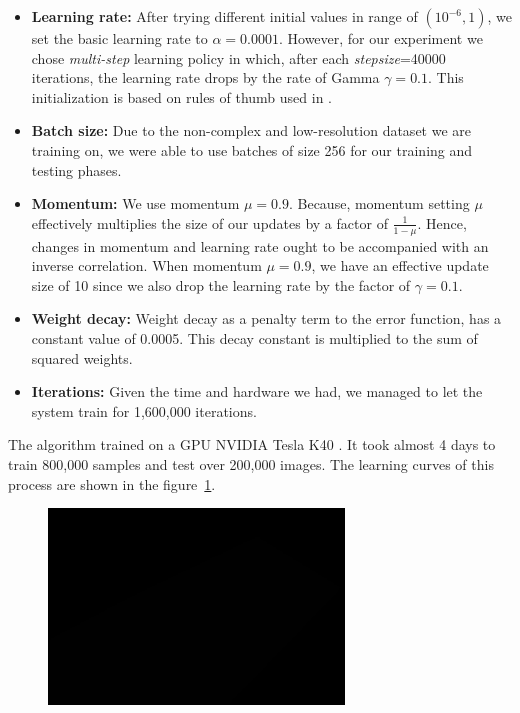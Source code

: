 \begin{itemize}
\label{solv:param}
\item \textbf{Learning rate:} After trying different initial values in range of $(10^{-6}, 1)$, we set the basic learning rate to $\alpha = 0.0001$. However, for our experiment we chose \textit{multi-step} learning policy in which, after each \textit{stepsize}=40000 iterations, the learning rate drops by the rate of Gamma $\gamma = 0.1$. This initialization is based on rules of thumb used in \cite{krizhevsky2012imagenet}.
\item \textbf{Batch size:} Due to the non-complex and low-resolution dataset we are training on, we were able to use batches of size 256 for our training and testing phases.
\item \textbf{Momentum:} We use momentum $\mu = 0.9$. Because, momentum setting $\mu$ effectively multiplies the size of our updates by a factor of $\frac{1}{1-\mu}$. Hence, changes in momentum and learning rate ought to be accompanied with an inverse correlation. When momentum $\mu = 0.9$, we have an effective update size of 10 since we also drop the learning rate by the factor of $\gamma= 0.1$.
\item \textbf{Weight decay:} Weight decay as a penalty term to the error function, has a constant value of 0.0005. This decay constant is multiplied to the sum of squared weights.
\item \textbf{Iterations:} Given the time and hardware we had, we managed to let the system train for 1,600,000 iterations.
\end{itemize}

\noindent The algorithm trained on a GPU NVIDIA \cite{kirk2007nvidia} Tesla K40 \cite{lindholm2008nvidia}. It took almost 4 days to train 800,000 samples and test over 200,000 images. The learning curves of this process are shown in the figure~\ref{fig:curve}.

\begin{figure}[H]
	\centering
	{\includegraphics[width=0.7\textwidth]{images/1}}
	\caption{}
	\label{fig:curve}
\end{figure}

